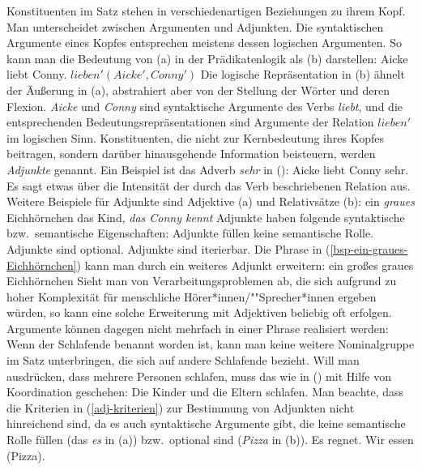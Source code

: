 Konstituenten im Satz stehen in verschiedenartigen Beziehungen zu ihrem Kopf.
Man unterscheidet zwischen Argumenten und Adjunkten. Die syntaktischen Argumente
eines Kopfes entsprechen meistens dessen logischen Argumenten. So kann man
die Bedeutung von (a) in der Prädikatenlogik als (b) darstellen:
\eal
\ex Aicke liebt Conny.
\ex $lieben'(Aicke', Conny')$
\zl
Die logische Repräsentation in (b) ähnelt der Äußerung in (a),
abstrahiert aber von der Stellung der Wörter und deren Flexion.
\emph{Aicke} und \emph{Conny} sind syntaktische Argumente des Verbs \emph{liebt},
und die entsprechenden Bedeutungsrepräsentationen sind Argumente der Relation $lieben'$
im logischen Sinn. 
Konstituenten, die nicht zur Kernbedeutung ihres Kopfes beitragen,
sondern darüber hinausgehende Information beisteuern, werden \emph{Adjunkte}
genannt. Ein Beispiel ist das Adverb \emph{sehr} in ():
\ea
Aicke liebt Conny sehr.
\z
Es sagt etwas über die Intensität der durch das Verb beschriebenen Relation aus.
Weitere Beispiele für Adjunkte sind Adjektive (a) und Relativsätze (b):
\eal
\ex\label{bsp-ein-graues-Eichhörnchen}
ein \emph{graues} Eichhörnchen
\ex das Kind, \emph{das Conny kennt}
\zl
Adjunkte haben folgende syntaktische bzw.\ semantische Eigenschaften:
\eal
\label{adj-kriterien}
\ex Adjunkte füllen keine semantische Rolle.
\ex Adjunkte sind optional.
\ex Adjunkte sind iterierbar.
\zl
Die Phrase in (\ref{bsp-ein-graues-Eichhörnchen}) kann man durch ein weiteres Adjunkt erweitern:
\ea
ein großes graues Eichhörnchen
\z
Sieht man von Verarbeitungsproblemen ab, die sich aufgrund zu hoher Komplexität
für menschliche Hörer*innen/""Sprecher*innen ergeben würden, so kann eine solche Erweiterung
mit Adjektiven beliebig oft erfolgen. Argumente können dagegen nicht mehrfach 
in einer Phrase realisiert werden:
\z
Wenn der Schlafende benannt worden ist, kann man keine weitere Nominalgruppe
im Satz unterbringen, die sich auf andere Schlafende bezieht. Will man ausdrücken,
dass mehrere Personen schlafen, muss das wie in () mit Hilfe von
Koordination geschehen:
\ea
Die Kinder und die Eltern schlafen.
\z
Man beachte, dass die Kriterien in (\ref{adj-kriterien}) zur Bestimmung von Adjunkten
nicht hinreichend sind, da es auch syntaktische
Argumente gibt, die keine semantische Rolle füllen (das \emph{es} in (a)) bzw.\ optional
sind (\emph{Pizza} in (b)).
\eal
\ex Es regnet.
\ex Wir essen (Pizza).
\zl

